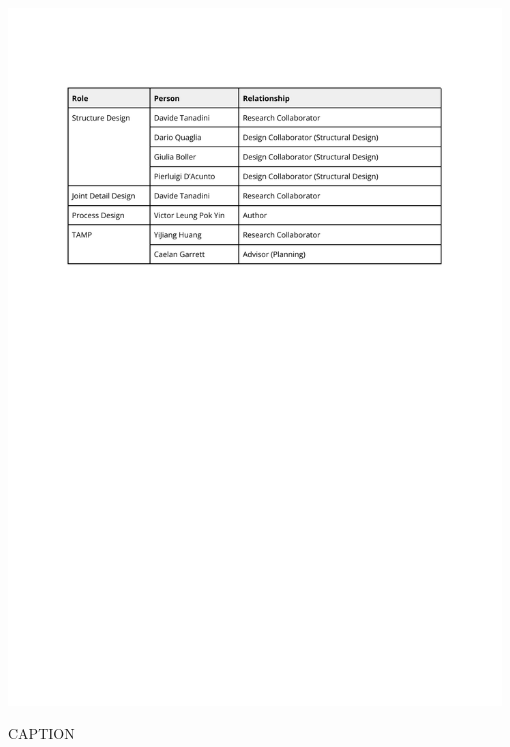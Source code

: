 \begin{table}[!h]
    \includegraphics[page=2, trim=25.4mm 195mm 25.4mm 33mm, clip, width=0.98\textwidth]{tables/Tables in Chapter 8.pdf}
    \caption{CAPTION}
    \label{table:LABELTEXT}
\end{table}